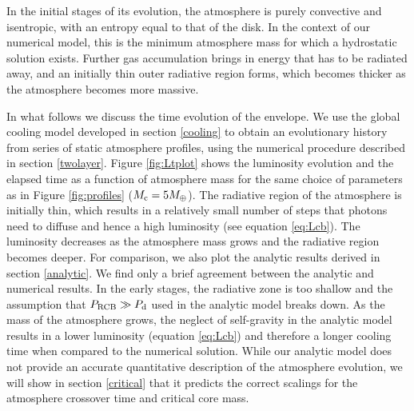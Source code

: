 \documentclass[apj]{emulateapj}
\begin{document}
In the initial stages of its evolution, the atmosphere is purely convective and isentropic, with an entropy equal to that of the disk. In the context of our numerical model, this is the minimum atmosphere mass for which a hydrostatic solution exists. Further gas accumulation brings in energy that has to be radiated away, and an initially thin outer radiative region forms, which becomes thicker as the atmosphere becomes more massive. 



In what follows we discuss the time evolution of the envelope. We use the global cooling model developed in section \ref{cooling} to obtain an evolutionary history from series of static atmosphere profiles, using the numerical procedure described in section \ref{twolayer}. Figure \ref{fig:Ltplot} shows the luminosity evolution and the elapsed time as a function of atmosphere mass for the same choice of parameters as in Figure \ref{fig:profiles} ($M_{\rm c}=5 M_{\oplus}$). The radiative region of the atmosphere is initially thin, which results in a relatively small number of steps that photons need to diffuse and hence a high luminosity (see equation \ref{eq:Lcb}). The luminosity decreases as the atmosphere mass grows and the radiative region becomes deeper. For comparison, we also plot the analytic results derived in section \ref{analytic}. We find only a brief agreement between the analytic and numerical results. In the early stages, the radiative zone is too shallow and the assumption that $P_{\rm RCB} \gg P_{\rm d}$ used in the analytic model breaks down. As the mass of the atmosphere grows, the neglect of self-gravity in the analytic model results in a lower luminosity (equation \ref{eq:Lcb}) and therefore a longer cooling time when compared to the numerical solution. While our analytic model does not provide an accurate quantitative description of the atmosphere evolution, we will show in section \ref{critical} that it predicts the correct scalings for the atmosphere crossover time and critical core mass.  %
\end{document}
